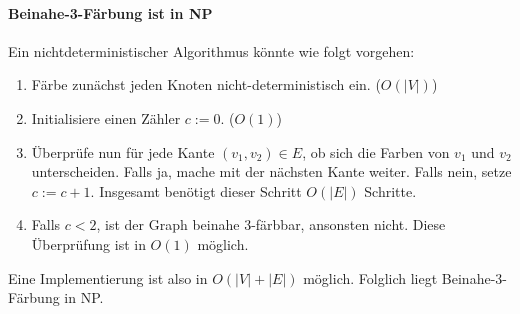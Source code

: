 \paragraph{Beinahe-3-Färbung ist in NP}
Ein nichtdeterministischer Algorithmus könnte wie folgt vorgehen:
\begin{enumerate}
	\item
		Färbe zunächst jeden Knoten nicht-deterministisch ein.
		($O(|V|)$)
	\item
		Initialisiere einen Zähler $c := 0$. ($O(1)$)
	\item
		Überprüfe nun für jede Kante $(v_1,v_2) \in E$, ob sich die
		Farben von $v_1$ und $v_2$ unterscheiden. Falls ja, mache mit
		der nächsten Kante weiter. Falls nein, setze $c:= c + 1$.
		Insgesamt benötigt dieser Schritt $O(|E|)$ Schritte.
	\item
		Falls $c < 2$, ist der Graph beinahe 3-färbbar, ansonsten nicht.
		Diese Überprüfung ist in $O(1)$ möglich.

\end{enumerate}
Eine Implementierung ist also in $O(|V|+|E|)$ möglich. Folglich liegt
Beinahe-3-Färbung in NP.
